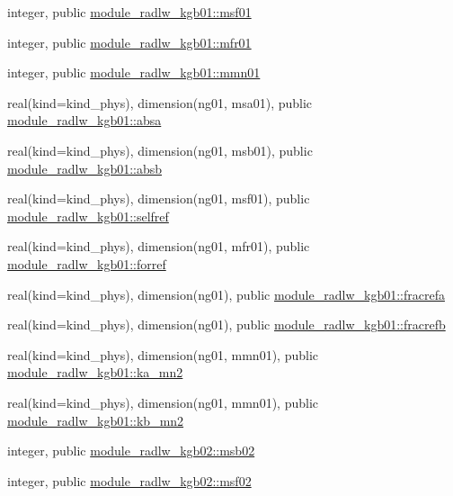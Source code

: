 \begin{DoxyCompactItemize}
integer, public \hyperlink{group__module__radlw__main_ga321c2e84e14d28142d08bb5fbe485a67}{module\+\_\+radlw\+\_\+kgb01\+::msf01}
\item 
integer, public \hyperlink{group__module__radlw__main_ga4bd2e710d96291436f9ee36e99816a19}{module\+\_\+radlw\+\_\+kgb01\+::mfr01}
\item 
integer, public \hyperlink{group__module__radlw__main_ga218c6844f9043f362571f091a4f80522}{module\+\_\+radlw\+\_\+kgb01\+::mmn01}
\item 
real(kind=kind\+\_\+phys), dimension(ng01, msa01), public \hyperlink{group__module__radlw__main_gacdbe767d50d503c4a89d4042dd0dee8e}{module\+\_\+radlw\+\_\+kgb01\+::absa}
\item 
real(kind=kind\+\_\+phys), dimension(ng01, msb01), public \hyperlink{group__module__radlw__main_gabdaefe1c38d8bfcac5ef9b878fac77cb}{module\+\_\+radlw\+\_\+kgb01\+::absb}
\item 
real(kind=kind\+\_\+phys), dimension(ng01, msf01), public \hyperlink{group__module__radlw__main_ga14c7cc68b26c0ab1fdfda6faa2d485d5}{module\+\_\+radlw\+\_\+kgb01\+::selfref}
\item 
real(kind=kind\+\_\+phys), dimension(ng01, mfr01), public \hyperlink{group__module__radlw__main_gacd70a32f88808dc40c39edee5b76adbe}{module\+\_\+radlw\+\_\+kgb01\+::forref}
\item 
real(kind=kind\+\_\+phys), dimension(ng01), public \hyperlink{group__module__radlw__main_ga0bca660247ac37483cd55c6936056631}{module\+\_\+radlw\+\_\+kgb01\+::fracrefa}
\item 
real(kind=kind\+\_\+phys), dimension(ng01), public \hyperlink{group__module__radlw__main_ga19b6a3893965817e82c77bee1de536cd}{module\+\_\+radlw\+\_\+kgb01\+::fracrefb}
\item 
real(kind=kind\+\_\+phys), dimension(ng01, mmn01), public \hyperlink{group__module__radlw__main_ga0a4f08c625f2f25f132200811af42331}{module\+\_\+radlw\+\_\+kgb01\+::ka\+\_\+mn2}
\item 
real(kind=kind\+\_\+phys), dimension(ng01, mmn01), public \hyperlink{group__module__radlw__main_gac357df5f66a7e384e22db58203ac294a}{module\+\_\+radlw\+\_\+kgb01\+::kb\+\_\+mn2}
\item 
integer, public \hyperlink{group__module__radlw__main_ga03e70b84fd16795104a3fb7b425af70c}{module\+\_\+radlw\+\_\+kgb02\+::msb02}
\item 
integer, public \hyperlink{group__module__radlw__main_ga99b728d38d664afc203303563541ab5c}{module\+\_\+radlw\+\_\+kgb02\+::msf02}
\item 

\end{DoxyCompactItemize}
